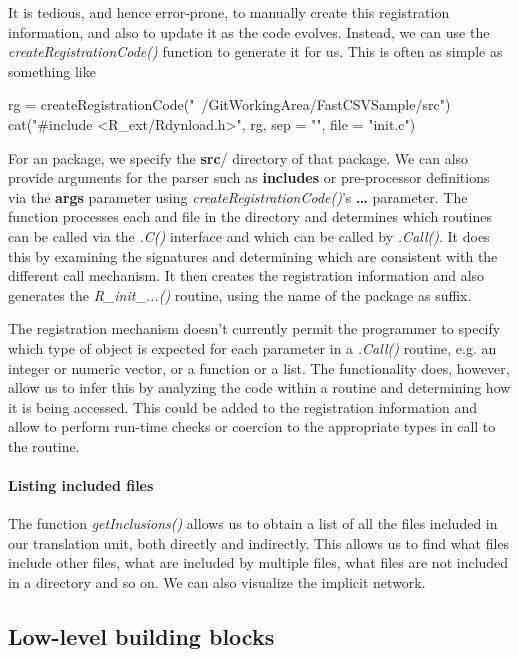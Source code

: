 \documentclass[article]{jss}
\def\C{\proglang{C}}
\def\Cpp{\proglang{C$++$}}
\def\R{\proglang{R}}
\def\Rpkg#1{\pkg{#1}}
\def\Rfunc#1{\textsl{#1()}}
\def\Cfunc#1{\textit{#1()}}
\def\dir#1{\textbf{#1}/}
\def\Rarg#1{\textbf{#1}}
\begin{document}
It is tedious, and hence error-prone, to manually create this
registration information, and also to update it as the code evolves.
Instead, we can use the \Rfunc{createRegistrationCode} function to
generate it for us.  This is often as simple as something like
\begin{RCode}
rg = createRegistrationCode("~/GitWorkingArea/FastCSVSample/src")  
cat("#include <R_ext/Rdynload.h>",  rg, sep = "\n", file = "init.c")
\end{RCode}
For an \R{} package, we specify the \dir{src} directory of that
package.  We can also provide arguments for the parser such as
\Rarg{includes} or pre-processor definitions via the \Rarg{args} parameter
using \Rfunc{createRegistrationCode}'s \Rarg{\dots} parameter.  The function processes each \C{} and \Cpp{}
file in the directory and determines which routines can be called via
the \Rfunc{.C} interface and which can be called by \Rfunc{.Call}.  It
does this by examining the signatures and determining which are
consistent with the different call mechanism.  It then creates the
registration information and also generates the \Cfunc{R_init_...}
routine, using the name of the package as suffix.

The \R{} registration mechanism doesn't currently permit the
programmer to specify which type of \R{} object is expected for each
parameter in a \Rfunc{.Call} routine, e.g. an integer or numeric
vector, or a function or a list.  The \Rpkg{RCIndex} functionality
does, however, allow us to infer this by analyzing the code within a
routine and determining how it is being accessed.  This could be added
to the registration information and allow \R{} to perform run-time
checks or coercion to the appropriate types in call to the routine.


\paragraph{Listing included files}
The function \Rfunc{getInclusions} allows us to obtain a list of all
the files included in our translation unit, both directly and
indirectly.  This allows us to find what files include other files,
what are included by multiple files, what files are not included in a
directory and so on. We can also visualize the implicit network.


\subsection{Low-level building blocks}\label{sec:BuildingBlocks}
\end{document}
